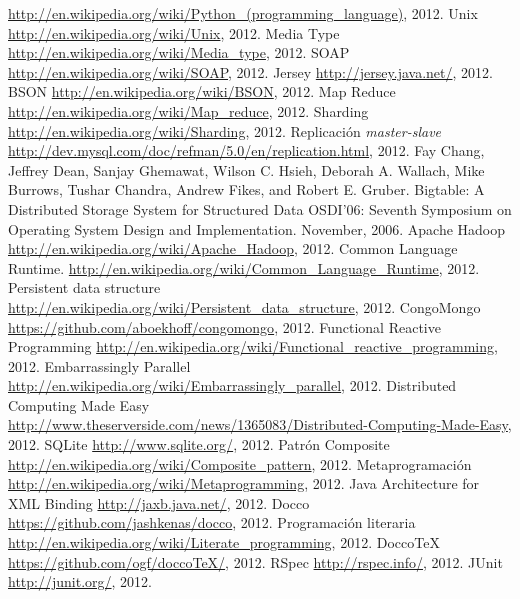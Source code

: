 \documentclass[a4paper,12pt,twoside]{report}
\begin{document}
\begin{thebibliography}{1}
  \newblock
  \url{http://en.wikipedia.org/wiki/Python_(programming_language)}, 2012.
  \newblock Unix
  \newblock \url{http://en.wikipedia.org/wiki/Unix}, 2012.
  \newblock Media Type
  \newblock \url{http://en.wikipedia.org/wiki/Media_type}, 2012.
  \newblock SOAP
  \newblock \url{http://en.wikipedia.org/wiki/SOAP}, 2012.
  \newblock Jersey
  \newblock \url{http://jersey.java.net/}, 2012.
  \newblock BSON
  \newblock \url{http://en.wikipedia.org/wiki/BSON}, 2012.
  \newblock Map Reduce
  \newblock \url{http://en.wikipedia.org/wiki/Map_reduce}, 2012.
  \newblock Sharding
  \newblock \url{http://en.wikipedia.org/wiki/Sharding}, 2012.
  \newblock Replicación \emph{master-slave}
  \newblock
  \url{http://dev.mysql.com/doc/refman/5.0/en/replication.html}, 2012.
  Fay Chang, Jeffrey Dean, Sanjay Ghemawat, Wilson C. Hsieh, Deborah A. Wallach, Mike Burrows, Tushar Chandra, Andrew Fikes, and Robert E. Gruber.
  \newblock Bigtable: A Distributed Storage System for Structured Data
  \newblock OSDI'06: Seventh Symposium on Operating System Design and
  Implementation. November, 2006.
  \newblock Apache Hadoop
  \newblock \url{http://en.wikipedia.org/wiki/Apache_Hadoop}, 2012.
  \newblock Common Language Runtime.
  \newblock
  \url{http://en.wikipedia.org/wiki/Common_Language_Runtime}, 2012.
  \newblock Persistent data structure
  \newblock
  \url{http://en.wikipedia.org/wiki/Persistent_data_structure}, 2012.
  \newblock CongoMongo
  \newblock \url{https://github.com/aboekhoff/congomongo}, 2012.
  \newblock Functional Reactive Programming
  \newblock
  \url{http://en.wikipedia.org/wiki/Functional_reactive_programming}, 2012.
  \newblock Embarrassingly Parallel
  \newblock \url{http://en.wikipedia.org/wiki/Embarrassingly_parallel}, 2012.
  \newblock Distributed Computing Made Easy
  \newblock
  \url{http://www.theserverside.com/news/1365083/Distributed-Computing-Made-Easy},
  2012.
  \newblock SQLite
  \newblock \url{http://www.sqlite.org/}, 2012.
  \newblock Patrón Composite
  \newblock \url{http://en.wikipedia.org/wiki/Composite_pattern},
  2012.
  \newblock Metaprogramación
  \newblock \url{http://en.wikipedia.org/wiki/Metaprogramming}, 2012.
  \newblock Java Architecture for XML Binding
  \newblock \url{http://jaxb.java.net/}, 2012.
  \newblock Docco
  \newblock \url{https://github.com/jashkenas/docco}, 2012.
  \newblock Programación literaria
  \newblock \url{http://en.wikipedia.org/wiki/Literate_programming},
  2012.
  \newblock DoccoTeX
  \newblock \url{https://github.com/ogf/doccoTeX/}, 2012.
  \newblock RSpec
  \newblock \url{http://rspec.info/}, 2012.
  \newblock JUnit
  \newblock \url{http://junit.org/}, 2012.
\end{thebibliography}
\end{document}
